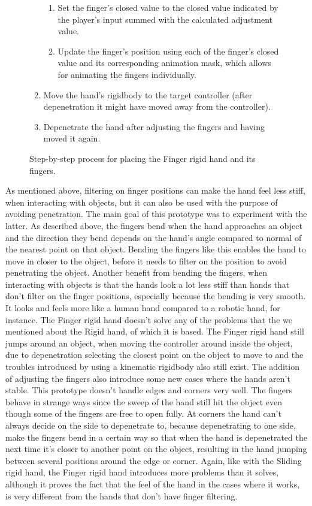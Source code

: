 \begin{figure}[H]
\begin{enumerate}[noitemsep]
\begin{enumerate}[noitemsep]
\item Set the finger's closed value to the closed value indicated by the player's input summed with the calculated adjustment value.
\item Update the finger's position using each of the finger's closed value and its corresponding animation mask, which allows for animating the fingers individually.
\end{enumerate}
\item Move the hand's rigidbody to the target controller (after depenetration it might have moved away from the controller).
\item Depenetrate the hand after adjusting the fingers and having moved it again.
\end{enumerate}
\caption{Step-by-step process for placing the Finger rigid hand and its fingers.}
\label{fig:stepByStepFingerRigidHand}
\end{figure}

As mentioned above, filtering on finger positions can make the hand feel less stiff, when interacting with objects, but it can also be used with the purpose of avoiding penetration. The main goal of this prototype was to experiment with the latter. As described above, the fingers bend when the hand approaches an object and the direction they bend depends on the hand's angle compared to normal of the nearest point on that object. Bending the fingers like this enables the hand to move in closer to the object, before it needs to filter on the position to avoid penetrating the object. Another benefit from bending the fingers, when interacting with objects is that the hands look a lot less stiff than hands that don't filter on the finger positions, especially because the bending is very smooth. It looks and feels more like a human hand compared to a robotic hand, for instance. The Finger rigid hand doesn't solve any of the problems that the we mentioned about the Rigid hand, of which it is based. The Finger rigid hand still jumps around an object, when moving the controller around inside the object, due to depenetration selecting the closest point on the object to move to and the troubles introduced by using a kinematic rigidbody also still exist. The addition of adjusting the fingers also introduce some new cases where the hands aren't stable. This prototype doesn't handle edges and corners very well. The fingers behave in strange ways since the sweep of the hand still hit the object even though some of the fingers are free to open fully. At corners the hand can't always decide on the side to depenetrate to, because depenetrating to one side, make the fingers bend in a certain way so that when the hand is depenetrated the next time it's closer to another point on the object, resulting in the hand jumping between several positions around the edge or corner. Again, like with the Sliding rigid hand, the Finger rigid hand introduces more problems than it solves, although it proves the fact that the feel of the hand in the cases where it works, is very different from the hands that don't have finger filtering.

